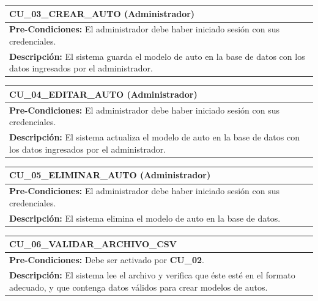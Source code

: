 \begin{center}
  \begin{tabular}{| p{7.5cm} | p{7.5cm} |}
    \hline
    \multicolumn{2}{|p{15cm}|}{\textbf{CU\_03\_CREAR\_AUTO} (Administrador)} \\ \hline
    \multicolumn{2}{|p{15cm}|}{\textbf{Pre-Condiciones:} El administrador debe haber iniciado sesión con sus credenciales.} \\ \hline
    \multicolumn{2}{|p{15cm}|}{\textbf{Descripción:} El sistema guarda el modelo de auto en la base de datos con los datos ingresados por el administrador. } \\
    \hline
  \end{tabular}
\end{center}

\begin{center}
  \begin{tabular}{| p{7.5cm} | p{7.5cm} |}
    \hline
    \multicolumn{2}{|p{15cm}|}{\textbf{CU\_04\_EDITAR\_AUTO} (Administrador)} \\ \hline
    \multicolumn{2}{|p{15cm}|}{\textbf{Pre-Condiciones:} El administrador debe haber iniciado sesión con sus credenciales.} \\ \hline
    \multicolumn{2}{|p{15cm}|}{\textbf{Descripción:} El sistema actualiza el modelo de auto en la base de datos con los datos ingresados por el administrador.} \\
    \hline
  \end{tabular}
\end{center}

\begin{center}
  \begin{tabular}{| p{7.5cm} | p{7.5cm} |}
    \hline
    \multicolumn{2}{|p{15cm}|}{\textbf{CU\_05\_ELIMINAR\_AUTO} (Administrador)} \\ \hline
    \multicolumn{2}{|p{15cm}|}{\textbf{Pre-Condiciones:} El administrador debe haber iniciado sesión con sus credenciales.} \\ \hline
    \multicolumn{2}{|p{15cm}|}{\textbf{Descripción:} El sistema elimina el modelo de auto en la base de datos.} \\
    \hline
  \end{tabular}
\end{center}

\begin{center}
  \begin{tabular}{| p{7.5cm} | p{7.5cm} |}
    \hline
    \multicolumn{2}{|p{15cm}|}{\textbf{CU\_06\_VALIDAR\_ARCHIVO\_CSV}} \\ \hline
    \multicolumn{2}{|p{15cm}|}{\textbf{Pre-Condiciones:} Debe ser activado por \textbf{CU\_02}.} \\ \hline
    \multicolumn{2}{|p{15cm}|}{\textbf{Descripción:} El sistema lee el archivo y verifica que éste esté en el formato adecuado, y que contenga datos válidos para crear modelos de autos.} \\
    \hline
  \end{tabular}
\end{center}

